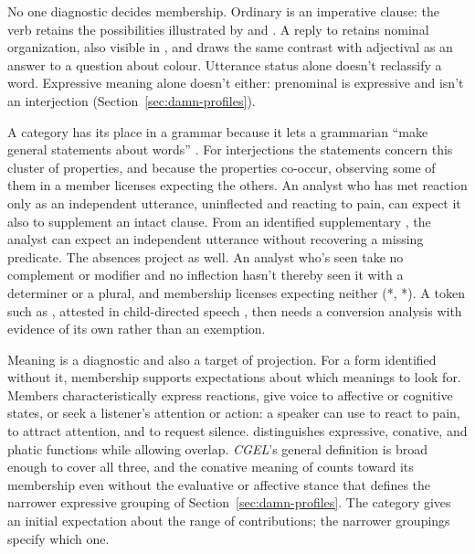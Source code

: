 \documentclass[12pt]{article}
\begin{document}
No one diagnostic decides membership. Ordinary  is an
imperative clause: the verb retains the possibilities illustrated by
 and . A reply 
to  retains nominal organization, also
visible in , and \textcite[124--125]{wilkins1992}
draws the same contrast with adjectival  as an answer to a
question about colour. Utterance status alone doesn't reclassify a word.
Expressive meaning alone doesn't either: prenominal  is
expressive and isn't an interjection (Section~\ref{sec:damn-profiles}).

A category has its place in a grammar because it lets a grammarian
\enquote{make general statements about words} \citep[30]{HuddlestonPullum2002}.
For interjections the statements concern this cluster of properties, and
because the properties co-occur, observing some of them in a member
licenses expecting the others. An analyst who has met reaction
 only as an independent utterance, uninflected and reacting
to pain, can expect it also to supplement an intact clause. From an
identified supplementary , the analyst can expect an
independent utterance without recovering a missing predicate. The
absences project as well. An analyst who's seen  take no
complement or modifier and no inflection hasn't thereby seen it with a
determiner or a plural, and membership licenses expecting neither
(*, *). A token such as
, attested in child-directed speech
\citep[36]{stange2016}, then needs a conversion analysis with evidence of
its own rather than an exemption.

Meaning is a diagnostic and also a target of projection. For a form
identified without it, membership supports expectations about which
meanings to look for. Members characteristically express reactions, give
voice to affective or cognitive states, or seek a listener's attention or
action: a speaker can use  to react to pain, 
to attract attention, and  to request silence.
\textcite[113--115]{ameka1992} distinguishes expressive, conative, and
phatic functions while allowing overlap. \textit{CGEL}'s general definition
is broad enough to cover all three, and the conative meaning of 
counts toward its membership even without the evaluative or affective stance
that defines the narrower
expressive grouping of Section~\ref{sec:damn-profiles}. The category gives
an initial expectation about the range of contributions; the narrower
groupings specify which one.
\end{document}
